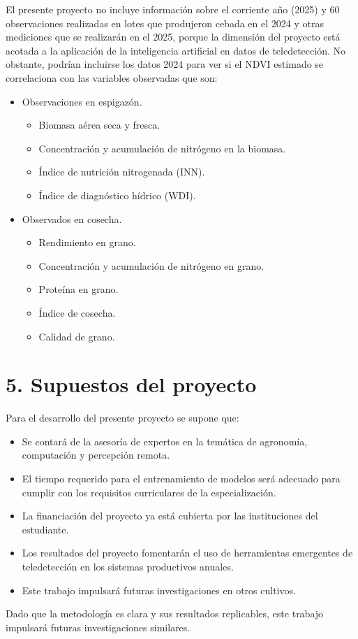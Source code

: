 \documentclass[
11pt, %
]{charter}
\begin{document}
El presente proyecto no incluye información sobre el corriente año (2025) y 60 observaciones realizadas en lotes que produjeron cebada en el 2024 y otras mediciones que se realizarán en el 2025, porque la dimensión del proyecto está acotada a la aplicación de la inteligencia artificial en datos de teledetección. No obstante, podrían incluirse los datos 2024 para ver si el NDVI estimado se correlaciona con las variables observadas que son:
\begin{itemize}
	\item Observaciones en espigazón.
		\begin{itemize}
		\item Biomasa aérea seca y fresca.
		\item Concentración y acumulación de nitrógeno en la biomasa.
		\item Índice de nutrición nitrogenada (INN).
		\item Índice de diagnóstico hídrico (WDI).		
		\end{itemize}
	\item Observados en cosecha.
		\begin{itemize}
		\item Rendimiento en grano.
		\item Concentración y acumulación de nitrógeno en grano.
		\item Proteína en grano.
		\item Índice de cosecha.
		\item Calidad de grano.
		\end{itemize}
	
\end{itemize}



\section{5. Supuestos del proyecto}
\label{sec:supuestos}

Para el desarrollo del presente proyecto se supone que:

\begin{itemize}
	\item Se contará de la asesoría de expertos en la temática de agronomía, computación y percepción remota.
	\item El tiempo requerido para el entrenamiento de modelos será adecuado para cumplir con los requisitos curriculares de la especialización.
	\item La financiación del proyecto ya está cubierta por las instituciones del estudiante.
	\item Los resultados del proyecto fomentarán el uso de herramientas emergentes de teledetección en los sistemas productivos anuales.
	\item Este trabajo impulsará futuras investigaciones en otros cultivos.
\end{itemize}
Dado que la metodología es clara y sus resultados replicables, este trabajo impulsará futuras investigaciones similares.
\end{document}
